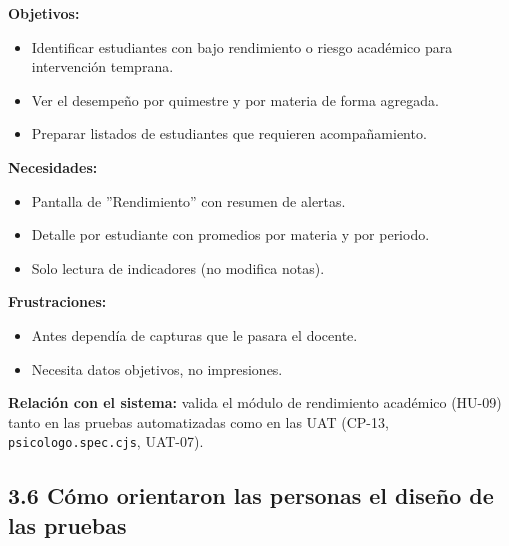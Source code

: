 \documentclass[11pt,a4paper]{article}
\begin{document}
\textbf{Objetivos:}


\begin{itemize}[leftmargin=*]
\item Identificar estudiantes con bajo rendimiento o riesgo académico para intervención temprana.
\item Ver el desempeño por quimestre y por materia de forma agregada.
\item Preparar listados de estudiantes que requieren acompañamiento.
\end{itemize}


\textbf{Necesidades:}


\begin{itemize}[leftmargin=*]
\item Pantalla de ''Rendimiento'' con resumen de alertas.
\item Detalle por estudiante con promedios por materia y por periodo.
\item Solo lectura de indicadores (no modifica notas).
\end{itemize}


\textbf{Frustraciones:}


\begin{itemize}[leftmargin=*]
\item Antes dependía de capturas que le pasara el docente.
\item Necesita datos objetivos, no impresiones.
\end{itemize}


\textbf{Relación con el sistema:} valida el módulo de rendimiento académico (HU-09) tanto en las pruebas automatizadas como en las UAT (CP-13, \texttt{psicologo.spec.cjs}, UAT-07).


\subsection*{3.6 Cómo orientaron las personas el diseño de las pruebas}
\end{document}
